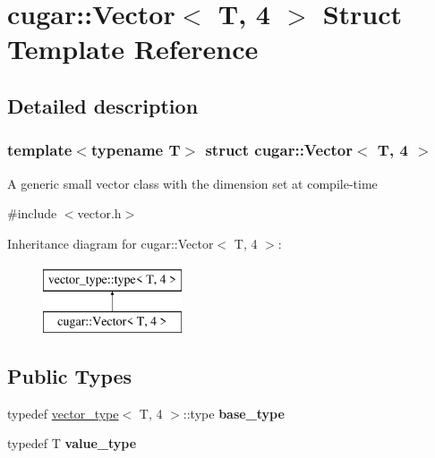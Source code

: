 \hypertarget{structcugar_1_1_vector_3_01_t_00_014_01_4}{}\section{cugar\+:\+:Vector$<$ T, 4 $>$ Struct Template Reference}
\label{structcugar_1_1_vector_3_01_t_00_014_01_4}


\subsection{Detailed description}
\subsubsection*{template$<$typename T$>$\newline
struct cugar\+::\+Vector$<$ T, 4 $>$}

A generic small vector class with the dimension set at compile-\/time 

{\ttfamily \#include $<$vector.\+h$>$}

Inheritance diagram for cugar\+:\+:Vector$<$ T, 4 $>$\+:\begin{figure}[H]
\begin{center}
\leavevmode
\includegraphics[height=2.000000cm]{structcugar_1_1_vector_3_01_t_00_014_01_4}
\end{center}
\end{figure}
\subsection*{Public Types}
\begin{DoxyCompactItemize}
\item 
\mbox{\label{structcugar_1_1_vector_3_01_t_00_014_01_4_a55dcee1324ac0fc24d85c137b128722f}} 
typedef \hyperlink{structcugar_1_1vector__type}{vector\+\_\+type}$<$ T, 4 $>$\+::type {\bfseries base\+\_\+type}
\item 
\mbox{\label{structcugar_1_1_vector_3_01_t_00_014_01_4_a555ccacabeeffdab0a20c6a7e677301e}} 
typedef T {\bfseries value\+\_\+type}
\end{DoxyCompactItemize}
